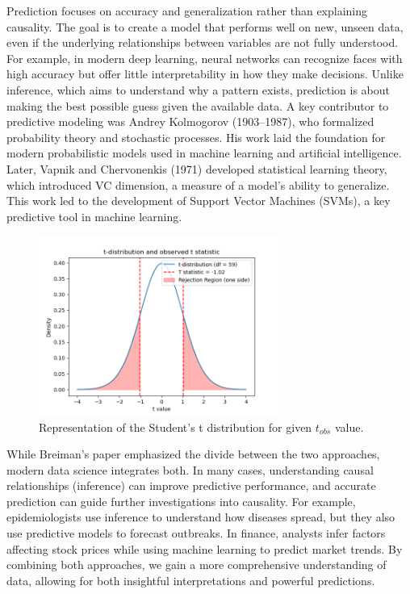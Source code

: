 \documentclass{book}
\begin{document}
Prediction focuses on accuracy and generalization rather than explaining causality. The goal is to create a model that performs well on new, unseen data, even if the underlying relationships between variables are not fully understood. For example, in modern deep learning, neural networks can recognize faces with high accuracy but offer little interpretability in how they make decisions. Unlike inference, which aims to understand why a pattern exists, prediction is about making the best possible guess given the available data. A key contributor to predictive modeling was Andrey Kolmogorov (1903–1987), who formalized probability theory and stochastic processes. His work laid the foundation for modern probabilistic models used in machine learning and artificial intelligence. Later, Vapnik and Chervonenkis (1971) developed statistical learning theory, which introduced VC dimension, a measure of a model’s ability to generalize. This work led to the development of Support Vector Machines (SVMs), a key predictive tool in machine learning.\\

\begin{figure}[ht]
    \centering
    \includegraphics[width=0.7\textwidth]{figures/chapter4/t_2_samples_distribution.png}
    \caption{Representation of the Student's t distribution for given $t_{obs}$ value.}
    \label{fig:t_2_sample_obs}
\end{figure}

While Breiman’s paper emphasized the divide between the two approaches, modern data science integrates both. In many cases, understanding causal relationships (inference) can improve predictive performance, and accurate prediction can guide further investigations into causality. For example, epidemiologists use inference to understand how diseases spread, but they also use predictive models to forecast outbreaks. In finance, analysts infer factors affecting stock prices while using machine learning to predict market trends. By combining both approaches, we gain a more comprehensive understanding of data, allowing for both insightful interpretations and powerful predictions.
\end{document}
